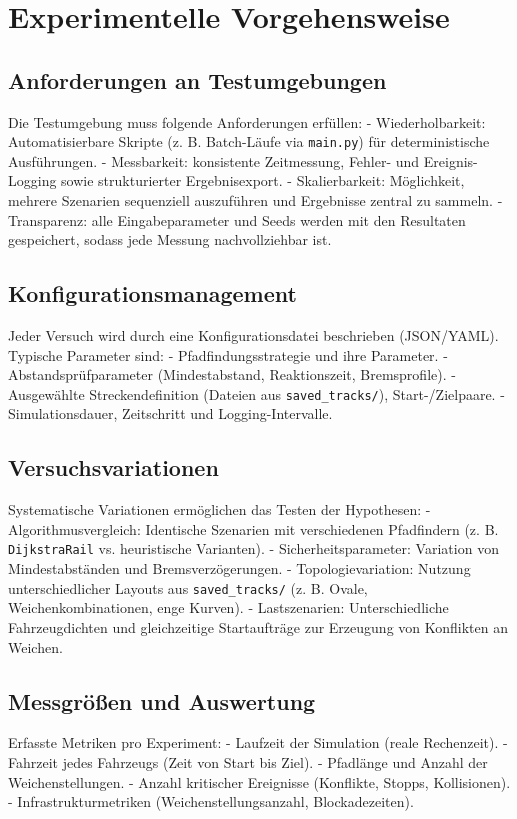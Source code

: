 \section{Experimentelle Vorgehensweise}
\label{ch:Methodik:sec:Experimentelle Vorgehensweise}

\subsection*{Anforderungen an Testumgebungen}
Die Testumgebung muss folgende Anforderungen erfüllen:
- Wiederholbarkeit: Automatisierbare Skripte (z. B. Batch-Läufe via \texttt{main.py}) für deterministische Ausführungen.
- Messbarkeit: konsistente Zeitmessung, Fehler- und Ereignis-Logging sowie strukturierter Ergebnisexport.
- Skalierbarkeit: Möglichkeit, mehrere Szenarien sequenziell auszuführen und Ergebnisse zentral zu sammeln.
- Transparenz: alle Eingabeparameter und Seeds werden mit den Resultaten gespeichert, sodass jede Messung nachvollziehbar ist.

\subsection*{Konfigurationsmanagement}
Jeder Versuch wird durch eine Konfigurationsdatei beschrieben (JSON/YAML). Typische Parameter sind:
- Pfadfindungsstrategie und ihre Parameter.
- Abstandsprüfparameter (Mindestabstand, Reaktionszeit, Bremsprofile).
- Ausgewählte Streckendefinition (Dateien aus \texttt{saved\_tracks/}), Start-/Zielpaare.
- Simulationsdauer, Zeitschritt und Logging-Intervalle.

\subsection*{Versuchsvariationen}
Systematische Variationen ermöglichen das Testen der Hypothesen:
- Algorithmusvergleich: Identische Szenarien mit verschiedenen Pfadfindern (z. B. \texttt{DijkstraRail} vs. heuristische Varianten).
- Sicherheitsparameter: Variation von Mindestabständen und Bremsverzögerungen.
- Topologievariation: Nutzung unterschiedlicher Layouts aus \texttt{saved\_tracks/} (z. B. Ovale, Weichenkombinationen, enge Kurven).
- Lastszenarien: Unterschiedliche Fahrzeugdichten und gleichzeitige Startaufträge zur Erzeugung von Konflikten an Weichen.

\subsection*{Messgrößen und Auswertung}
Erfasste Metriken pro Experiment:
- Laufzeit der Simulation (reale Rechenzeit).
- Fahrzeit jedes Fahrzeugs (Zeit von Start bis Ziel).
- Pfadlänge und Anzahl der Weichenstellungen.
- Anzahl kritischer Ereignisse (Konflikte, Stopps, Kollisionen).
- Infrastrukturmetriken (Weichenstellungsanzahl, Blockadezeiten).

